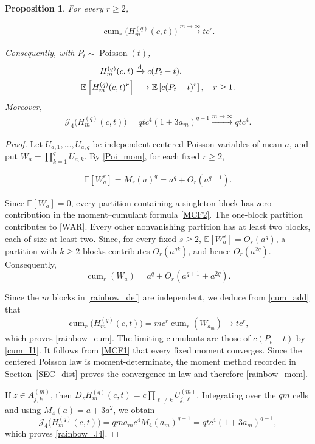 \documentclass[letterpaper,11pt,reqno]{amsart}
\numberwithin{equation}{section}
\theoremstyle{plain}
\newtheorem{proposition}[theorem]{Proposition}
\theoremstyle{definition}
\theoremstyle{remark}
\newcommand{\E}{\mathbb{E}}
\DeclareMathOperator{\cum}{cum}
\DeclareMathOperator{\Pois}{Poisson}
\newcommand{\noi}{\noindent}
\newcommand{\Jfour}{\mathcal J_4}
\begin{document}
\begin{proposition}
\label{prop_rainbow}
For every $r\geq2$,

\noi
\begin{align}
 \cum_r\bigl(H_m^{(q)}(c,t)\bigr)
\xrightarrow{m\to\infty} tc^r.
 \label{rainbow_cum}
\end{align}

Consequently, with $P_t\sim\Pois(t)$,
\noi
\begin{align}
 H_m^{(q)}(c,t)&\xrightarrow{\mathrm d}c(P_t-t),
 \notag\\
 \E\left[H_m^{(q)}(c,t)^r\right]
 &\longrightarrow\E\left[c(P_t-t)^r\right],
 \quad r\geq1.
 \label{rainbow_mom}
\end{align}
Moreover,
\noi
\begin{align}
 \Jfour\bigl(H_m^{(q)}(c,t)\bigr)
 =qtc^4(1+3a_m)^{q-1}
 \xrightarrow{m\to\infty} qtc^4.
 \label{rainbow_J4}
\end{align}

\end{proposition}

\begin{proof}
Let $U_{a,1},\ldots,U_{a,q}$ be independent centered Poisson
variables of mean $a$, and put
$
 W_a=\prod_{k=1}^qU_{a,k}.
$
By \eqref{Poi_mom}, for each fixed $r\geq2$,

\noi
\begin{align}\label{WAR}
 \E[W_a^r]
 =M_r(a)^q
 =a^q+O_r(a^{q+1}).
\end{align}

Since $\E[W_a]=0$, every partition containing a singleton block
has zero contribution in the moment--cumulant formula \eqref{MCF2}.
The one-block partition contributes to \eqref{WAR}.
Every other nonvanishing partition has at least two blocks, each of
size at least two.  Since, for every fixed $s\geq2$,
 $\E[W_a^s]=O_s(a^q)$,
a partition with $k\geq2$ blocks contributes $O_r(a^{qk})$, and hence
$O_r(a^{2q})$.  Consequently,
\[
 \cum_r(W_a)
 =
 a^q+O_r(a^{q+1}+a^{2q}).
\]

Since the $m$ blocks in \eqref{rainbow_def} are independent, we deduce from
\eqref{cum_add} that
\noi
\begin{align*}
 \cum_r\bigl(H_m^{(q)}(c,t)\bigr)
 =mc^r\cum_r(W_{a_m})
 \longrightarrow tc^r,
\end{align*}
which proves \eqref{rainbow_cum}.  The limiting cumulants are those of
$c(P_t-t)$ by \eqref{cum_I1}.  It follows from \eqref{MCF1} that every
fixed moment converges.  Since the centered Poisson law is
moment-determinate, the moment method recorded in Section~\ref{SEC_dist}
proves the convergence in law and therefore \eqref{rainbow_mom}.


If $z\in A_{j,k}^{(m)}$, then
$D_zH_m^{(q)}(c,t)=c\prod_{\ell\neq k}U_{j,\ell}^{(m)}$.
Integrating over the $qm$ cells and using $M_4(a)=a+3a^2$, we obtain
\[
 \Jfour\bigl(H_m^{(q)}(c,t)\bigr)
 =qma_mc^4M_4(a_m)^{q-1}
 =qtc^4(1+3a_m)^{q-1},
\]
which proves \eqref{rainbow_J4}.
\qedhere

\end{proof}
\end{document}
